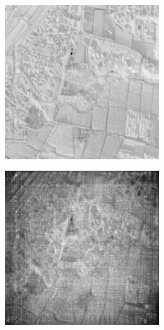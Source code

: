 \documentclass[10pt,twocolumn,letterpaper]{article}
\begin{document}
\begin{figure}[!ht]
  \begin{subfigure}[b]{0.19\textwidth}
      \centering
      \includegraphics[width=\textwidth]{../figs/outputs/pan/7.png}
      \label{fig:pan}
  \end{subfigure}
  \hfill
  \begin{subfigure}[b]{0.19\textwidth}
      \centering
      \includegraphics[width=\textwidth]{../figs/outputs/cycleGan/7.png}

\end{subfigure}
\end{figure}
\end{document}
